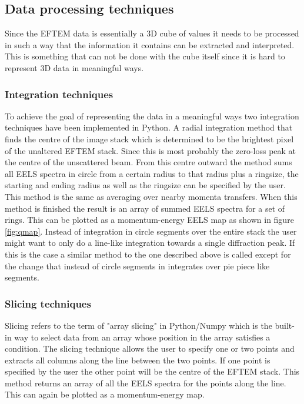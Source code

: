 \begin{multicols}{2}
\subsection{Data processing techniques}
Since the EFTEM data is essentially a 3D cube of values it needs to be processed in such a way that the information it contains can be extracted and interpreted. This is something that can not be done with the cube itself since it is hard to represent 3D data in meaningful ways.\\
%
\subsubsection{Integration techniques}
To achieve the goal of representing the data in a meaningful ways two integration techniques have been implemented in Python.
A radial integration method that finds the centre of the image stack which is determined to be the brightest pixel of the unaltered EFTEM stack. Since this is most probably the zero-loss peak at the centre of the unscattered beam.
From this centre outward the method sums all EELS spectra in circle from a certain radius to that radius plus a ringsize, the starting and ending radius as well as the ringsize can be specified by the user.
This method is the same as averaging over nearby momenta transfers.
When this method is finished the result is an array of summed EELS spectra for a set of rings. This can be plotted as a momentum-energy EELS map as shown in figure \ref{fig:qmap}.
Instead of integration in circle segments over the entire stack the user might want to only do a line-like integration towards a single diffraction peak. If this is the case a similar method to the one described above is called except for the change that instead of circle segments in integrates over pie piece like segments.\\
%
\subsubsection{Slicing techniques}
Slicing refers to the term of "array slicing" in Python/Numpy\cite{Harris2020} which is the built-in way to select data from an array whose position in the array satisfies a condition. The slicing technique allows the user to specify one or two points and extracts all columns along the line between the two points. If one point is specified by the user the other point will be the centre of the EFTEM stack. This method returns an array of all the EELS spectra for the points along the line. This can again be plotted as a momentum-energy map.\\
%

\end{multicols}
